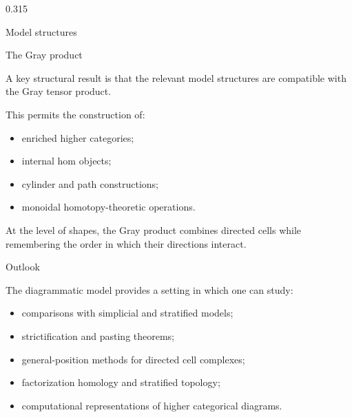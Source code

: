 \documentclass[final]{beamer}
\newcommand{\Gray}{\otimes}
\begin{document}
\begin{frame}[fragile, t]
\begin{columns}[t,totalwidth=\textwidth]
\begin{column}{0.315\textwidth}
\begin{block}{Model structures}
\end{block}

\begin{block}{The Gray product}

A key structural result is that the relevant model structures are
compatible with the Gray tensor product.

\medskip

This permits the construction of:

\begin{itemize}
  \item enriched higher categories;
  \item internal hom objects;
  \item cylinder and path constructions;
  \item monoidal homotopy-theoretic operations.
\end{itemize}

\medskip

At the level of shapes, the Gray product combines directed cells while
remembering the order in which their directions interact.

\begin{center}
\end{center}

\end{block}

\begin{block}{Outlook}

The diagrammatic model provides a setting in which one can study:

\begin{itemize}
  \item comparisons with simplicial and stratified models;
  \item strictification and pasting theorems;
  \item general-position methods for directed cell complexes;
  \item factorization homology and stratified topology;
  \item computational representations of higher categorical diagrams.
\end{itemize}


\end{block}
\end{column}
\end{columns}
\end{frame}
\end{document}
